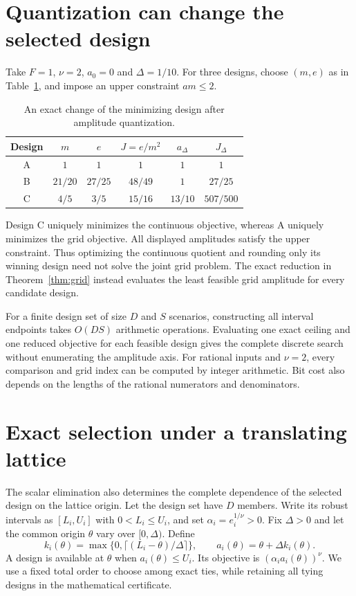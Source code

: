\documentclass[11pt,a4paper]{article}
\begin{document}
\section{Quantization can change the selected design}
Take $F=1$, $\nu=2$, $a_0=0$ and $\Delta=1/10$.
For three designs, choose $(m,e)$ as in Table~\ref{tab:reversal}, and impose
an upper constraint $a m\le2$.

\begin{table}[h]
\centering
\begin{tabular}{@{}c c c c c c@{}}
\toprule
Design & $m$ & $e$ & $J=e/m^2$ & $a_\Delta$ & $J_\Delta$\\
\midrule
A & $1$ & $1$ & $1$ & $1$ & $1$\\
B & $21/20$ & $27/25$ & $48/49$ & $1$ & $27/25$\\
C & $4/5$ & $3/5$ & $15/16$ & $13/10$ & $507/500$\\
\bottomrule
\end{tabular}
\caption{An exact change of the minimizing design after amplitude quantization.}
\label{tab:reversal}
\end{table}

Design C uniquely minimizes the continuous objective, whereas A uniquely
minimizes the grid objective. All displayed amplitudes satisfy the upper
constraint. Thus optimizing the continuous quotient and rounding only its
winning design need not solve the joint grid problem. The exact reduction
in Theorem~\ref{thm:grid} instead evaluates the least feasible grid amplitude
for every candidate design.

For a finite design set of size $D$ and $S$ scenarios, constructing all
interval endpoints takes $O(DS)$ arithmetic operations. Evaluating one
exact ceiling and one reduced objective for each feasible design gives the
complete discrete search without enumerating the amplitude axis.
For rational inputs and $\nu=2$, every comparison and grid index can be
computed by integer arithmetic. Bit cost also depends on the lengths of
the rational numerators and denominators.

\section{Exact selection under a translating lattice}\label{sec:phase}
The scalar elimination also determines the complete dependence of the
selected design on the lattice origin. Let the design set have $D$ members.
Write its robust intervals as $[L_i,U_i]$ with $0<L_i\le U_i$,
and set $\alpha_i=e_i^{1/\nu}>0$. Fix $\Delta>0$ and let the common
origin $\theta$ vary over $[0,\Delta)$. Define
\[
 k_i(\theta)=\max\{0,\lceil(L_i-\theta)/\Delta\rceil\},\qquad
 a_i(\theta)=\theta+\Delta k_i(\theta).
\]
A design is available at $\theta$ when $a_i(\theta)\le U_i$.
Its objective is $(\alpha_i a_i(\theta))^\nu$.
We use a fixed total order to choose among exact ties, while retaining
all tying designs in the mathematical certificate.
\end{document}
